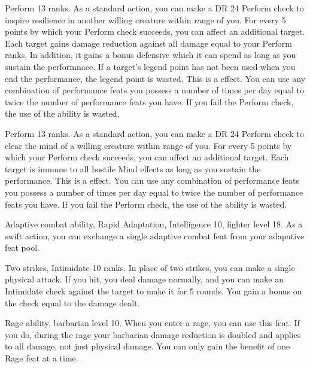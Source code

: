 \featpre Perform 13 ranks.
\featben As a standard action, you can make a DR 24 Perform check to inspire resilience in another willing creature within \rngmed range of you.
For every 5 points by which your Perform check succeeds, you can affect an additional target.
Each target gains damage reduction against all damage equal to your Perform ranks.
In addition, it gains a bonus defensive  which it can spend as long as you sustain the performnace.
If a target's legend point has not been used when you end the performance, the legend point is wasted.
This is a  effect.
 You can use any combination of performance feats you possess a number of times per day equal to twice the number of performance feats you have.
If you fail the Perform check, the use of the ability is wasted.

\featpre Perform 13 ranks.
\featben As a standard action, you can make a DR 24 Perform check to clear the mind of a willing creature within \rngmed range of you.
For every 5 points by which your Perform check succeeds, you can affect an additional target.
Each target is immune to all hostile Mind effects as long as you sustain the performance.
This is a  effect.
You can use any combination of performance feats you possess a number of times per day equal to twice the number of performance feats you have.
If you fail the Perform check, the use of the ability is wasted.

\featpres Adaptive combat ability, Rapid Adaptation, Intelligence 10, fighter level 18.
\featben As a swift action, you can exchange a single adaptive combat feat from your adapative feat pool.

\featpres Two strikes, Intimidate 10 ranks.
\featben In place of two strikes, you can make a single physical attack.
If you hit, you deal damage normally, and you can make an Intimidate check against the target to make it \shaken for 5 rounds.
You gain a bonus on the check equal to the damage dealt.

\featpres Rage ability, barbarian level 10.
\featben When you enter a rage, you can use this feat. If you do, during the rage your barbarian damage reduction is doubled and applies to all damage, not just physical damage.
 You can only gain the benefit of one Rage feat at a time.


